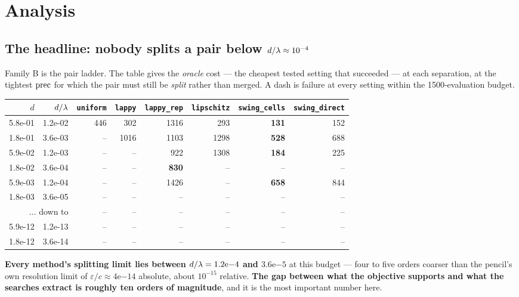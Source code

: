 \section{Analysis}

\subsection{The headline: nobody splits a pair below \texorpdfstring{$d/\lambda \approx 10^{-4}$}{d/lam ~ 1e-4}}
\label{sec:headline}

Family B is the pair ladder. The table gives the \emph{oracle} cost --- the cheapest tested
setting that succeeded --- at each separation, at the tightest $\mathrm{prec}$ for which the pair must
still be \emph{split} rather than merged. A dash is failure at every setting within the
1500-evaluation budget.

\begin{center}
\begin{tabular}{rrrrrrrr}
\toprule
$d$ & $d/\lambda$ & \texttt{uniform} & \texttt{lappy} & \texttt{lappy\_rep} & \texttt{lipschitz}
& \texttt{swing\_cells} & \texttt{swing\_direct} \\
\midrule
5.8e-01 & 1.2e-02 & 446 & 302 & 1316 & 293 & \textbf{131} & 152 \\
1.8e-01 & 3.6e-03 & --  & 1016 & 1103 & 1298 & \textbf{528} & 688 \\
5.9e-02 & 1.2e-03 & --  & -- & 922 & 1308 & \textbf{184} & 225 \\
1.8e-02 & 3.6e-04 & --  & -- & \textbf{830} & -- & -- & -- \\
5.9e-03 & 1.2e-04 & --  & -- & 1426 & -- & \textbf{658} & 844 \\
1.8e-03 & 3.6e-05 & --  & -- & -- & -- & -- & -- \\
\multicolumn{2}{r}{$\dots$ down to} & -- & -- & -- & -- & -- & -- \\
5.9e-12 & 1.2e-13 & --  & -- & -- & -- & -- & -- \\
1.8e-12 & 3.6e-14 & --  & -- & -- & -- & -- & -- \\
\bottomrule
\end{tabular}
\end{center}

\noindent
\textbf{Every method's splitting limit lies between $d/\lambda = 1.2\mathrm{e}{-4}$ and
$3.6\mathrm{e}{-5}$} at this budget --- four to five orders coarser than the pencil's own
resolution limit of $\varepsilon/c \approx 4\mathrm{e}{-14}$ absolute, about $10^{-15}$
relative. \textbf{The gap between what the objective supports and what the searches extract is
roughly ten orders of magnitude}, and it is the most important number here.

